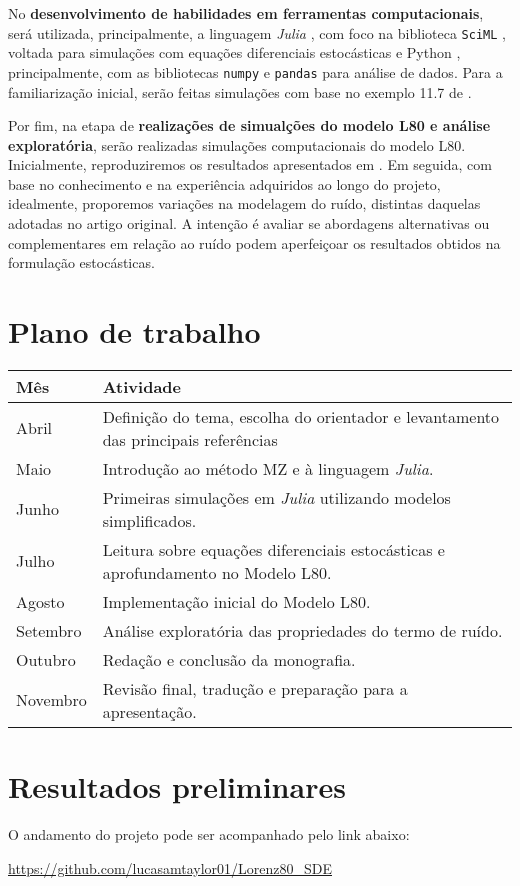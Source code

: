 \documentclass[12pt]{article}
\begin{document}
No \textbf{desenvolvimento de habilidades em ferramentas computacionais}, será utilizada, principalmente, a linguagem \textit{Julia} \citep{julialang}, com foco na biblioteca \texttt{SciML} \citep{SDEJulia}, voltada para simulações com equações diferenciais estocásticas e Python \citep{Python}, principalmente, com as bibliotecas \texttt{numpy} \citep{numpy} e \texttt{pandas} \citep{pandas} para análise de dados. Para a familiarização inicial, serão feitas simulações com base no exemplo 11.7 de \citep[p.~169]{Pavliotis2008}.

Por fim, na etapa de \textbf{realizações de simualções do modelo L80 e análise exploratória}, serão realizadas simulações computacionais do modelo L80. Inicialmente, reproduziremos os resultados apresentados em \citet{Chekroun2021}. Em seguida, com base no conhecimento e na experiência adquiridos ao longo do projeto, idealmente, proporemos variações na modelagem do ruído, distintas daquelas adotadas no artigo original. A intenção é avaliar se abordagens alternativas ou complementares em relação ao ruído podem aperfeiçoar os resultados obtidos na formulação estocásticas.

\section*{Plano de trabalho}
\begin{center}
	\renewcommand{\arraystretch}{1.5}
	\begin{tabular}{p{3cm}p{10cm}}
		\toprule
		\textbf{Mês} & \textbf{Atividade}\\
		\midrule
		Abril         & Definição do tema, escolha do orientador e levantamento das principais referências\\
		Maio          & Introdução ao método MZ e à linguagem \textit{Julia}.\\
		Junho         & Primeiras simulações em \textit{Julia} utilizando modelos simplificados.\\
		Julho         & Leitura sobre equações diferenciais estocásticas e aprofundamento no Modelo L80.\\
		Agosto        & Implementação inicial do Modelo L80.\\
		Setembro      & Análise exploratória das propriedades do termo de ruído.\\
		Outubro       & Redação e conclusão da monografia.\\
		Novembro      & Revisão final, tradução e preparação para a apresentação.\\
		\bottomrule
	\end{tabular}
\end{center}

\section*{Resultados preliminares}
O andamento do projeto pode ser acompanhado pelo link abaixo:

\url{https://github.com/lucasamtaylor01/Lorenz80_SDE}

\newpage
\nocite{*}
\printbibliography[title={Referências}, label={sec:bib}]
\end{document}
